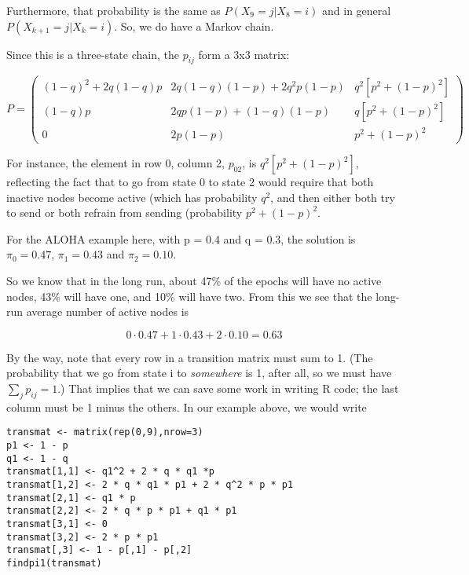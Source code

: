 Furthermore, that probability is the same as $P(X_9 = j | X_8 = i)$ and
in general $P(X_{k+1} = j | X_k = i)$.  So, we do have a Markov chain.

Since this is a three-state chain, the $p_{ij}$ form a 3x3 matrix:

\begin{equation}
P = 
\left (
\begin{array}{ccc}
(1-q)^2 + 2q(1-q)p & 
   2q(1-q)(1-p) + 2q^2p(1-p) & 
   q^2 [p^2+(1-p)^2] \\
(1-q) p & 
   2qp(1-p) + (1-q)(1-p) & 
   q[p^2+(1-p)^2] \\
0 & 
   2p(1-p) & 
   p^2+(1-p)^2
\end{array}
\right )
\end{equation}

For instance, the element in row 0, column 2, $p_{02}$, is
$q^2[p^2+(1-p)^2]$, reflecting the fact that to go from state 0 to state
2 would require that both inactive nodes become active (which has
probability $q^2$, and then either both try to send or both refrain from
sending (probability $p^2+(1-p)^2$.

For the ALOHA example here, with p = 0.4 and q = 0.3, the solution is
$\pi_0 = 0.47$, $\pi_1 = 0.43$ and $\pi_2 = 0.10$.

So we know that in the long run, about 47\% of the epochs will have no
active nodes, 43\% will have one, and 10\% will have two.  From this we
see that the long-run average number of active nodes is

\begin{equation}
0 \cdot 0.47 + 1 \cdot 0.43 + 2 \cdot 0.10 = 0.63
\end{equation}

By the way, note that every row in a transition matrix must sum to 1.
(The probability that we go from state i to {\it somewhere} is 1, after
all, so we must have $\sum_j p_{ij} = 1$.)  That implies that we can
save some work in writing R code; the last column must be 1 minus the
others.  In our example above, we would write

\begin{Verbatim}[fontsize=\relsize{-2}]
transmat <- matrix(rep(0,9),nrow=3)
p1 <- 1 - p
q1 <- 1 - q
transmat[1,1] <- q1^2 + 2 * q * q1 *p
transmat[1,2] <- 2 * q * q1 * p1 + 2 * q^2 * p * p1
transmat[2,1] <- q1 * p
transmat[2,2] <- 2 * q * p * p1 + q1 * p1
transmat[3,1] <- 0
transmat[3,2] <- 2 * p * p1
transmat[,3] <- 1 - p[,1] - p[,2]
findpi1(transmat)
\end{Verbatim}


